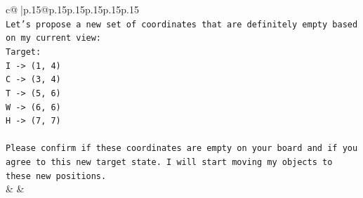\documentclass{article}
\begin{document}
{\begin{supertabular}{c@{$\;$}|p{.15\linewidth}@{}p{.15\linewidth}p{.15\linewidth}p{.15\linewidth}p{.15\linewidth}p{.15\linewidth}}
{{{\\ 
\texttt{Let's propose a new set of coordinates that are definitely empty based on my current view:} \\
\texttt{Target:} \\
\texttt{I {-}> (1, 4)} \\
\texttt{C {-}> (3, 4)} \\
\texttt{T {-}> (5, 6)} \\
\texttt{W {-}> (6, 6)} \\
\texttt{H {-}> (7, 7)} \\
\\ 
\texttt{Please confirm if these coordinates are empty on your board and if you agree to this new target state. I will start moving my objects to these new positions.} \\
            }
        }
    }
    & & \\ \\


\end{supertabular}}
\end{document}
